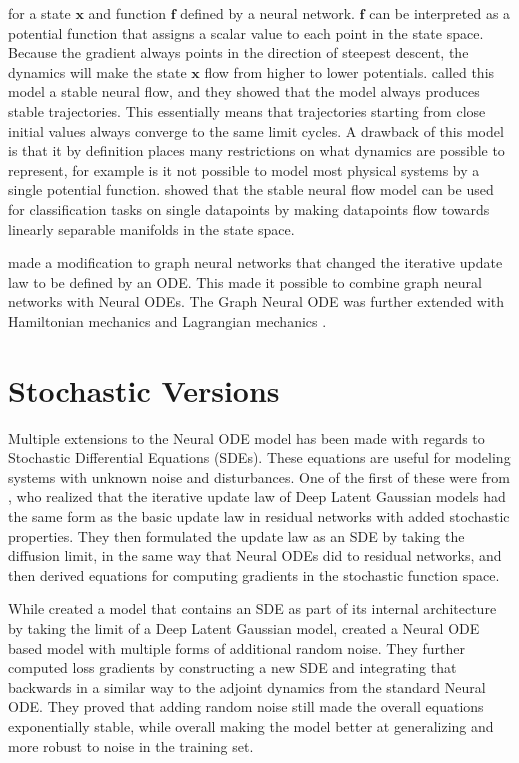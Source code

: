 \documentclass[12pt,a4paper]{book}
\begin{document}
\noindent for a state $\bm{x}$ and function $\bm{f}$ defined by a neural network. $\bm{f}$ can be interpreted as a potential function that assigns a scalar value to each point in the state space. Because the gradient always points in the direction of steepest descent, the dynamics will make the state $\bm{x}$ flow from higher to lower potentials. \cite{stableneuralflows} called this model a stable neural flow, and they showed that the model always produces stable trajectories. This essentially means that trajectories starting from close initial values always converge to the same limit cycles. A drawback of this model is that it by definition places many restrictions on what dynamics are possible to represent, for example is it not possible to model most physical systems by a single potential function. \cite{stableneuralflows} showed that the stable neural flow model can be used for classification tasks on single datapoints by making datapoints flow towards linearly separable manifolds in the state space.

\cite{graphnodes} made a modification to graph neural networks \citep{graphnn} that changed the iterative update law to be defined by an ODE. This made it possible to combine graph neural networks with Neural ODEs. The Graph Neural ODE was further extended with Hamiltonian mechanics \citep{graphhamiltonians} and Lagrangian mechanics \citep{lagrangiannode}.

\section{Stochastic Versions}

Multiple extensions to the Neural ODE model has been made with regards to Stochastic Differential Equations (SDEs). These equations are useful for modeling systems with unknown noise and disturbances. One of the first of these were from \cite{neuralsdegaussian}, who realized that the iterative update law of Deep Latent Gaussian models \citep{dlgm} had the same form as the basic update law in residual networks with added stochastic properties. They then formulated the update law as an SDE by taking the diffusion limit, in the same way that Neural ODEs did to residual networks, and then derived equations for computing gradients in the stochastic function space.

While \cite{neuralsdegaussian} created a model that contains an SDE as part of its internal architecture by taking the limit of a Deep Latent Gaussian model, \cite{neuralsde} created a Neural ODE based model with multiple forms of additional random noise. They further computed loss gradients by constructing a new SDE and integrating that backwards in a similar way to the adjoint dynamics from the standard Neural ODE. They proved that adding random noise still made the overall equations exponentially stable, while overall making the model better at generalizing and more robust to noise in the training set.
\end{document}
